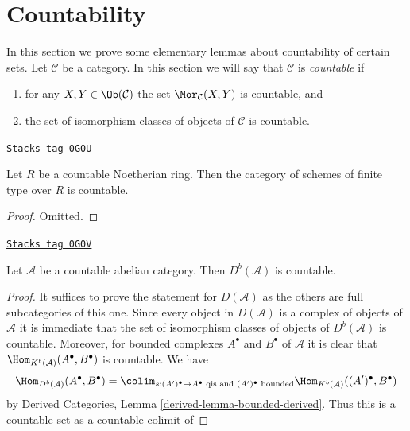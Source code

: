 \section{Countability}
\label{equiv-section-countability}
In this section we prove some elementary lemmas about countability
of certain sets. Let $\mathcal{C}$ be a category. In this section
we will say that $\mathcal{C}$ is {\it countable} if
\begin{enumerate}
\item for any $X, Y \in \Ob(\mathcal{C})$ the set
$\Mor_\mathcal{C}(X, Y)$ is countable, and
\item the set of isomorphism classes of objects of $\mathcal{C}$
is countable.
\end{enumerate}

\begin{lemma}
\label{equiv-lemma-countable-finite-type}
\href{https://stacks.math.columbia.edu/tag/0G0U}{\texttt{Stacks tag 0G0U}}

Let $R$ be a countable Noetherian ring. Then the category of schemes of finite
type over $R$ is countable.
\end{lemma}

\begin{proof}
Omitted.
\end{proof}

\begin{lemma}
\label{equiv-lemma-countable-abelian}
\href{https://stacks.math.columbia.edu/tag/0G0V}{\texttt{Stacks tag 0G0V}}

Let $\mathcal{A}$ be a countable abelian category.
Then $D^b(\mathcal{A})$ is countable.
\end{lemma}

\begin{proof}
It suffices to prove the statement for $D(\mathcal{A})$ as the others
are full subcategories of this one. Since every object in $D(\mathcal{A})$
is a complex of objects of $\mathcal{A}$ it is immediate that the set of
isomorphism classes of objects of $D^b(\mathcal{A})$ is countable.
Moreover, for bounded complexes $A^\bullet$ and $B^\bullet$ of $\mathcal{A}$
it is clear that $\Hom_{K^b(\mathcal{A})}(A^\bullet, B^\bullet)$ is countable.
We have
$$
\Hom_{D^b(\mathcal{A})}(A^\bullet, B^\bullet) =
\colim_{s : (A')^\bullet \to A^\bullet
\text{ qis and }(A')^\bullet\text{ bounded}}
\Hom_{K^b(\mathcal{A})}((A')^\bullet, B^\bullet)
$$
by Derived Categories, Lemma \ref{derived-lemma-bounded-derived}.
Thus this is a countable set as a countable colimit of
\end{proof}

